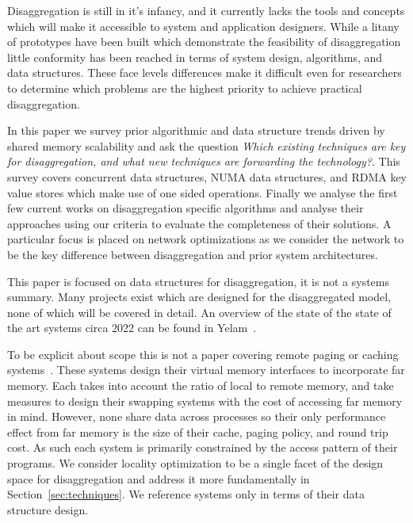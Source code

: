 
Disaggregation is still in it's infancy, and it currently lacks the tools and
concepts which will make it accessible to system and application designers.
While a litany of prototypes have been built which demonstrate the feasibility
of
disaggregation~\cite{infiniswap,fastswap,leap,legoos,aifm,kona,reigons,software-far,lite,semeru}
little conformity has been reached in terms of system design, algorithms, and
data structures. These face levels differences make it difficult even for
researchers to determine which problems are the highest priority to achieve
practical disaggregation.

In this paper we survey prior algorithmic and data structure trends driven by
shared memory scalability and ask the question \textit{Which existing techniques
are key for disaggregation, and what new techniques are forwarding the
technology?}. This survey covers concurrent data structures, NUMA data
structures, and RDMA key value stores which make use of one sided operations.
Finally we analyse the first few current works on disaggregation specific
algorithms and analyse their approaches using our criteria to evaluate the
completeness of their solutions.  A particular focus is placed on network
optimizations as we consider the network to be the key difference between
disaggregation and prior system architectures.


This paper is focused on data structures for disaggregation, it is not a systems
summary.  Many projects exist which are designed for the disaggregated model,
none of which will be covered in detail. An overview of the state of the state
of the art systems circa 2022 can be found in Yelam~\cite{yelam2022systems}.

To be explicit about scope this is not a paper covering remote paging or caching
systems~\cite{fastswap,kona,infiniswap,leap,legoos}. These systems design their
virtual memory interfaces to incorporate far memory. Each takes into account the
ratio of local to remote memory, and take measures to design their swapping
systems with the cost of accessing far memory in mind.  However, none share data
across processes so their only performance effect from far memory is the size of
their cache, paging policy, and round trip cost. As such each system is
primarily constrained by the access pattern of their programs. We consider
locality optimization to be a single facet of the design space for
disaggregation and address it more fundamentally in
Section~\ref{sec:techniques}. We reference systems only in terms of their data
structure design.

